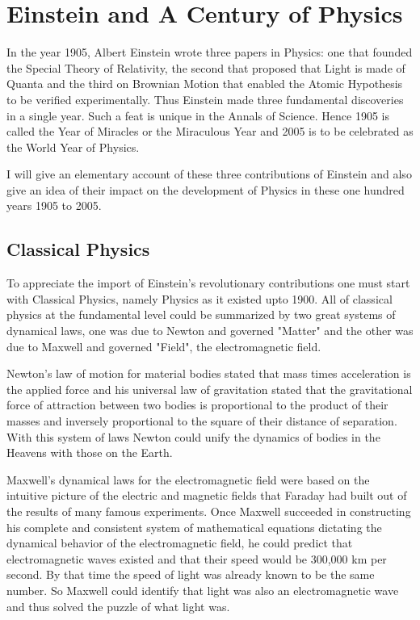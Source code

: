 \chapter[Einstein and A Century of Physics]{Einstein and A Century of Physics}


        

{}

In the year 1905, Albert Einstein wrote three papers in Physics:
one that founded the Special Theory of Relativity, the second that
proposed that Light is made of Quanta and the third on Brownian
Motion that enabled the Atomic Hypothesis to be verified experimentally.
Thus Einstein made three fundamental discoveries in a single year.
Such a feat is unique in the Annals of Science. Hence 1905 is called
the Year of Miracles or the Miraculous Year and 2005 is to be
celebrated as the World Year of Physics.

      I will give an elementary account of these three contributions
of Einstein and also give an idea of their impact on the development
of Physics in these one hundred years 1905 to 2005.

\section*{Classical Physics}

To appreciate the import of Einstein's revolutionary contributions
one must start with Classical Physics, namely Physics as it existed
upto 1900. All of classical physics at the fundamental level could
be summarized by two great systems of dynamical laws, one was due to
Newton and governed "Matter" and the other was due to Maxwell and
governed "Field", the electromagnetic field.

Newton's law of motion for material bodies stated that mass times
acceleration is the applied force and his universal law of gravitation
stated that the gravitational force of attraction between two bodies
is proportional to the product of their masses and inversely
proportional to the square of their distance of separation. With this
system of laws Newton could unify the dynamics of bodies in the
Heavens with those on the Earth.

Maxwell's dynamical laws for the electromagnetic field were based on
the intuitive picture of the electric and magnetic fields that Faraday
had built out of the results of many famous experiments. Once Maxwell
succeeded in constructing his complete and consistent system of
mathematical equations dictating the dynamical behavior of the
electromagnetic field, he could predict that electromagnetic waves
existed and that their speed would be 300,000 km per second. By that
time the speed of light was already known to be the same number. So
Maxwell could identify that light was also an electromagnetic wave
and thus solved the puzzle of what light was.


